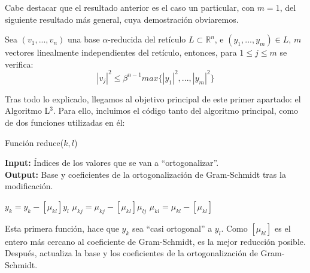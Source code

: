     Cabe destacar que el resultado anterior es el caso un particular, con $m = 1$, del siguiente resultado más general, cuya demostración obviaremos.

    \begin{teorema} \cite{artLLL}
        Sea $(v_{1}, ... , v_{n})$ una base $\alpha$-reducida del retículo $L \subset \mathbb{R}^{n}$, e $(y_{1}, ... , y_{m}) \in L$, $m$ vectores linealmente independientes del retículo, entonces, para $1 \leq j \leq m$ se verifica:
        \begin{equation}
            \left| v_{j} \right|^{2} \leq \beta^{n-1} max\{\left| y_{1} \right|^{2}, ... , \left| y_{m} \right|^{2}\}
        \end{equation}
    \end{teorema}

    Tras todo lo explicado, llegamos al objetivo principal de este primer apartado: el Algoritmo L$^{3}$. Para ello, incluimos el código \cite{tfgLag} tanto del algoritmo principal, como de dos funciones utilizadas en él:
    
    \begin{algorithm}[H]
        \caption{Función reduce($k, l$)}
        \textbf{Input:} Índices de los valores que se van a ``ortogonalizar''. \\
        \textbf{Output:} Base y coeficientes de la ortogonalización de Gram-Schmidt tras la modificación.
        \bigskip
        \begin{algorithmic}[1]
            \State $y_{k} = y_{k} - [\mu_{kl}] y_{l}$
            \State $\mu_{kj} = \mu_{kj} - [\mu_{kl}] \mu_{lj}$
            \EndFor
            \State $\mu_{kl} = \mu_{kl} - [\mu_{kl}]$
            \EndIf
        \end{algorithmic}
    \end{algorithm}

    Esta primera función, hace que $y_{k}$ sea ``casi ortogonal'' a $y_{l}$. Como $[\mu_{kl}]$ es el entero más cercano al coeficiente de Gram-Schmidt, es la mejor reducción posible. Después, actualiza la base y los coeficientes de la ortogonalización de Gram-Schmidt.
    
